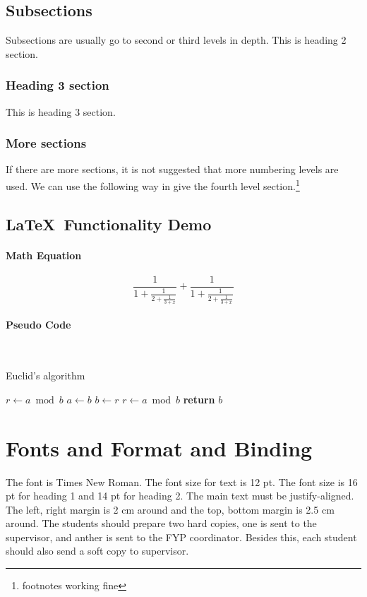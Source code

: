 \documentclass[12pt]{article}
\begin{document}
\subsection{Subsections}
Subsections are usually go to second or third levels in depth. This is heading 2 section.
\subsubsection{Heading 3 section}
This is heading 3 section.
\subsubsection{More sections}
If there are more sections, it is not suggested that more numbering levels are used. We can use the following way in give the fourth level section.\footnote{footnotes working fine}
\subsection{\LaTeX~Functionality Demo}
\paragraph{Math Equation}
\begin{equation}
    \frac{1}{\displaystyle 1+
    \frac{1}{\displaystyle 2+
    \frac{1}{\displaystyle 3+x}}} +
    \frac{1}{1+\frac{1}{2+\frac{1}{3+x}}}
\end{equation}
\paragraph{Pseudo Code}\mbox{}\\
\begin{algorithm}
    \caption{Euclid’s algorithm}\label{euclid}
    \begin{algorithmic}[1]
    \State $r\gets a\bmod b$
    \State $a\gets b$
    \State $b\gets r$
    \State $r\gets a\bmod b$
    \EndWhile\label{euclidendwhile}
    \State \textbf{return} $b$
    \EndProcedure
    \end{algorithmic}
\end{algorithm}


\section{Fonts and Format and Binding}
The font is Times New Roman. The font size for text is 12 pt. The font size is 16 pt for heading 1 and 14 pt for heading 2. The main text must be justify-aligned. The left, right margin is 2 cm around and the top, bottom margin is 2.5 cm around. The students should prepare two hard copies, one is sent to the supervisor, and anther is sent to the FYP coordinator. Besides this, each student should also send a soft copy to supervisor.\cite{Gusfield:97}\par
\end{document}
